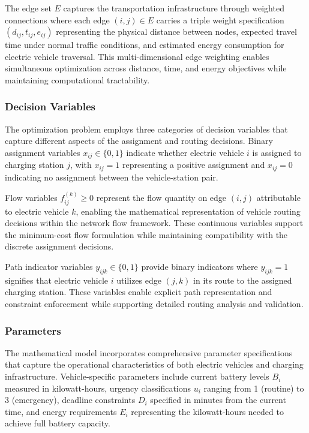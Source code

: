 \documentclass[12pt,a4paper]{article}
\begin{document}
The edge set $E$ captures the transportation infrastructure through weighted connections where each edge $(i,j) \in E$ carries a triple weight specification $(d_{ij}, t_{ij}, e_{ij})$ representing the physical distance between nodes, expected travel time under normal traffic conditions, and estimated energy consumption for electric vehicle traversal. This multi-dimensional edge weighting enables simultaneous optimization across distance, time, and energy objectives while maintaining computational tractability.

\subsubsection{Decision Variables}
The optimization problem employs three categories of decision variables that capture different aspects of the assignment and routing decisions. Binary assignment variables $x_{ij} \in \{0,1\}$ indicate whether electric vehicle $i$ is assigned to charging station $j$, with $x_{ij} = 1$ representing a positive assignment and $x_{ij} = 0$ indicating no assignment between the vehicle-station pair.

Flow variables $f_{ij}^{(k)} \geq 0$ represent the flow quantity on edge $(i,j)$ attributable to electric vehicle $k$, enabling the mathematical representation of vehicle routing decisions within the network flow framework. These continuous variables support the minimum-cost flow formulation while maintaining compatibility with the discrete assignment decisions.

Path indicator variables $y_{ijk} \in \{0,1\}$ provide binary indicators where $y_{ijk} = 1$ signifies that electric vehicle $i$ utilizes edge $(j,k)$ in its route to the assigned charging station. These variables enable explicit path representation and constraint enforcement while supporting detailed routing analysis and validation.

\subsubsection{Parameters}
The mathematical model incorporates comprehensive parameter specifications that capture the operational characteristics of both electric vehicles and charging infrastructure. Vehicle-specific parameters include current battery levels $B_i$ measured in kilowatt-hours, urgency classifications $u_i$ ranging from 1 (routine) to 3 (emergency), deadline constraints $D_i$ specified in minutes from the current time, and energy requirements $E_i$ representing the kilowatt-hours needed to achieve full battery capacity.
\end{document}
